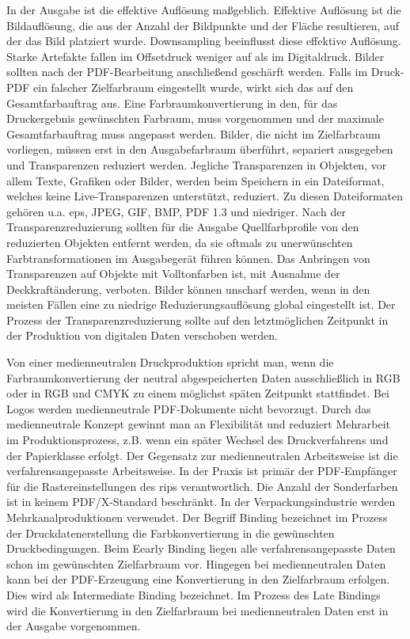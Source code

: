 In der Ausgabe ist die effektive Auflösung maßgeblich. Effektive Auflösung ist die Bildauflösung, die aus der Anzahl der Bildpunkte und der Fläche resultieren, auf der das Bild platziert wurde. Downsampling beeinflusst diese effektive Auflösung. Starke Artefakte fallen im Offsetdruck weniger auf als im Digitaldruck. Bilder sollten nach der PDF-Bearbeitung anschließend geschärft werden. Falls im Druck-PDF ein falscher Zielfarbraum eingestellt wurde, wirkt sich das auf den Gesamtfarbauftrag aus. Eine Farbraumkonvertierung in den, für das Druckergebnis gewünschten Farbraum, muss vorgenommen und der maximale Gesamtfarbauftrag muss angepasst werden. Bilder, die nicht im Zielfarbraum vorliegen, müssen erst in den Ausgabefarbraum überführt, separiert ausgegeben und Transparenzen reduziert werden. Jegliche Transparenzen in Objekten, vor allem Texte, Grafiken oder Bilder, werden beim Speichern in ein Dateiformat, welches keine Live-Transparenzen unterstützt, reduziert. Zu diesen Dateiformaten gehören u.a. \gls{eps}, JPEG, GIF, BMP, PDF 1.3 und niedriger. Nach der Transparenzreduzierung sollten für die Ausgabe Quellfarbprofile von den reduzierten Objekten entfernt werden, da sie oftmals zu unerwünschten Farbtransformationen im Ausgabegerät führen können. Das Anbringen von Transparenzen auf Objekte mit Volltonfarben ist, mit Ausnahme der Deckkraftänderung, verboten. Bilder können unscharf werden, wenn in den meisten Fällen eine zu niedrige Reduzierungsauflösung global eingestellt ist. Der Prozess der Transparenzreduzierung sollte auf den letztmöglichen Zeitpunkt in der Produktion von digitalen Daten verschoben werden.
\par
Von einer medienneutralen Druckproduktion spricht man, wenn die Farbraumkonvertierung der neutral abgespeicherten Daten ausschließlich in RGB oder in RGB und CMYK zu einem möglichst späten Zeitpunkt stattfindet. Bei Logos werden medienneutrale PDF-Dokumente nicht bevorzugt. Durch das medienneutrale Konzept gewinnt man an Flexibilität und reduziert Mehrarbeit im Produktionsprozess, z.B. wenn ein später Wechsel des Druckverfahrens und der Papierklasse erfolgt. Der Gegensatz zur medienneutralen Arbeitsweise ist die verfahrensangepasste Arbeitsweise. In der Praxis ist primär der PDF-Empfänger für die Rastereinstellungen des \gls{rip}s verantwortlich. Die Anzahl der Sonderfarben ist in keinem PDF/X-Standard beschränkt. In der Verpackungsindustrie werden Mehrkanalproduktionen verwendet. Der Begriff Binding bezeichnet im Prozess der Druckdatenerstellung die Farbkonvertierung in die gewünschten Druckbedingungen. Beim Eearly Binding liegen alle verfahrensangepasste Daten schon im gewünschten Zielfarbraum vor. Hingegen bei medienneutralen Daten kann bei der PDF-Erzeugung eine Konvertierung in den Zielfarbraum erfolgen. Dies wird als Intermediate Binding bezeichnet. Im Prozess des Late Bindings wird die Konvertierung in den Zielfarbraum bei medienneutralen Daten erst in der Ausgabe vorgenommen. \\
